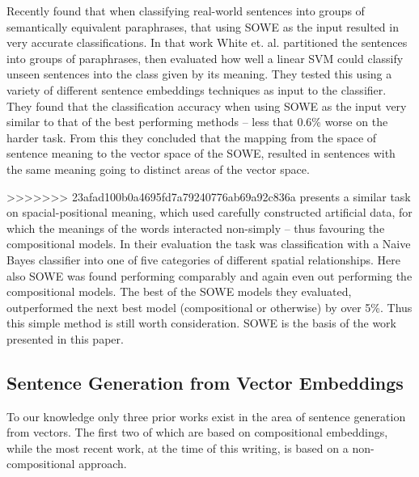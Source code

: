\documentclass[11pt]{article}
\theoremstyle{plain}
\theoremstyle{definition}
\begin{document}
Recently \textcite{White2015SentVecMeaning} found that when classifying real-world sentences into groups of semantically equivalent paraphrases, that using SOWE as the input resulted in very accurate classifications. In that work White et. al. partitioned the sentences into groups of paraphrases, then evaluated how well a linear SVM could classify unseen sentences into the class given by its meaning. They tested this using a variety of different sentence embeddings techniques as input to the classifier. They found that the classification accuracy when using SOWE as the input very similar to that of the best performing methods -- less that 0.6\% worse on the harder task. From this they concluded that the mapping from the space of sentence meaning to the vector space of the SOWE, resulted in sentences with the same meaning going to distinct areas of the vector space.

>>>>>>> 23afad100b0a4695fd7a79240776ab69a92c836a
\textcite{RitterPosition} presents a similar task on spacial-positional meaning, which used carefully constructed artificial data, for which the meanings of the words interacted non-simply -- thus favouring the compositional models. In their evaluation the task was classification with a Naive Bayes classifier into one of five categories of different spatial relationships. Here also SOWE was found performing comparably and again even out performing the compositional models. The best of the SOWE models they evaluated, outperformed the next best model (compositional or otherwise) by over 5\%. Thus this simple method is still worth consideration. SOWE is the basis of the work presented in this paper.

\subsection{Sentence Generation from Vector Embeddings}

To our knowledge only three prior works exist in the area of sentence generation from vectors. The first two of which are based on compositional embeddings, while the most recent work, at the time of this writing, is based on a non-compositional approach.

\newcommand{\p}{\tilde{p}_{1,2}}
\renewcommand{\u}{\tilde{u}}
\end{document}
